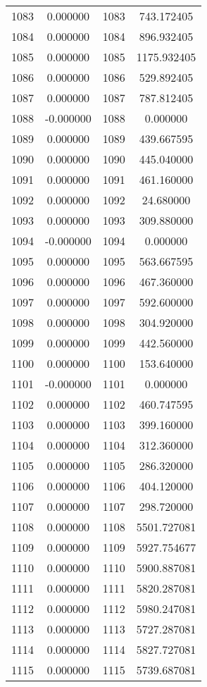 \documentclass[12pt]{article}
\begin{document}
\begin{longtable}{@{}cccc@{}}
1083 & 0.000000 & 1083 & 743.172405 \\
1084 & 0.000000 & 1084 & 896.932405 \\
1085 & 0.000000 & 1085 & 1175.932405 \\
1086 & 0.000000 & 1086 & 529.892405 \\
1087 & 0.000000 & 1087 & 787.812405 \\
1088 & -0.000000 & 1088 & 0.000000 \\
1089 & 0.000000 & 1089 & 439.667595 \\
1090 & 0.000000 & 1090 & 445.040000 \\
1091 & 0.000000 & 1091 & 461.160000 \\
1092 & 0.000000 & 1092 & 24.680000 \\
1093 & 0.000000 & 1093 & 309.880000 \\
1094 & -0.000000 & 1094 & 0.000000 \\
1095 & 0.000000 & 1095 & 563.667595 \\
1096 & 0.000000 & 1096 & 467.360000 \\
1097 & 0.000000 & 1097 & 592.600000 \\
1098 & 0.000000 & 1098 & 304.920000 \\
1099 & 0.000000 & 1099 & 442.560000 \\
1100 & 0.000000 & 1100 & 153.640000 \\
1101 & -0.000000 & 1101 & 0.000000 \\
1102 & 0.000000 & 1102 & 460.747595 \\
1103 & 0.000000 & 1103 & 399.160000 \\
1104 & 0.000000 & 1104 & 312.360000 \\
1105 & 0.000000 & 1105 & 286.320000 \\
1106 & 0.000000 & 1106 & 404.120000 \\
1107 & 0.000000 & 1107 & 298.720000 \\
1108 & 0.000000 & 1108 & 5501.727081 \\
1109 & 0.000000 & 1109 & 5927.754677 \\
1110 & 0.000000 & 1110 & 5900.887081 \\
1111 & 0.000000 & 1111 & 5820.287081 \\
1112 & 0.000000 & 1112 & 5980.247081 \\
1113 & 0.000000 & 1113 & 5727.287081 \\
1114 & 0.000000 & 1114 & 5827.727081 \\
1115 & 0.000000 & 1115 & 5739.687081 \\

\end{longtable}
\end{document}
